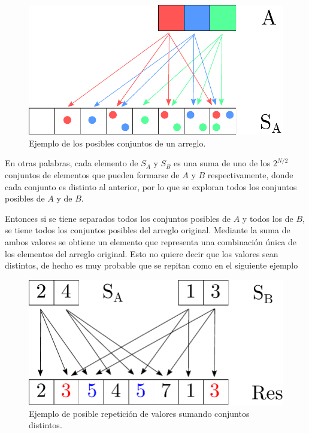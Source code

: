 \begin{figure}[H]
	\centering
	\includegraphics[scale=0.6]{imagenes/ex1_example1.pdf}
	\caption{Ejemplo de los posibles conjuntos de un arreglo.}
	\label{ej1:fig:combinations}
\end{figure}

En otras palabras, cada elemento de $S_A$ y $S_B$ es una suma de uno de los
$2^{N / 2}$ conjuntos de elementos que pueden formarse de $A$ y $B$
respectivamente, donde cada conjunto es distinto al anterior, por lo que se
exploran todos los conjuntos posibles de $A$ y de $B$.

Entonces si se tiene separados todos los conjuntos posibles de $A$ y todos los
de $B$, se tiene todos los conjuntos posibles del arreglo original. Mediante la
suma de ambos valores se obtiene un elemento que representa una combinación
única de los elementos del arreglo original. Esto no quiere decir que los
valores sean distintos, de hecho es muy probable que se repitan como en el
siguiente ejemplo

\begin{figure}[H]
	\centering
	\includegraphics[scale=0.6]{imagenes/ex1_example2.pdf}
	\caption{Ejemplo de posible repetición de valores sumando conjuntos
	distintos.}
	\label{ej1:fig:value_repetition}
\end{figure}


